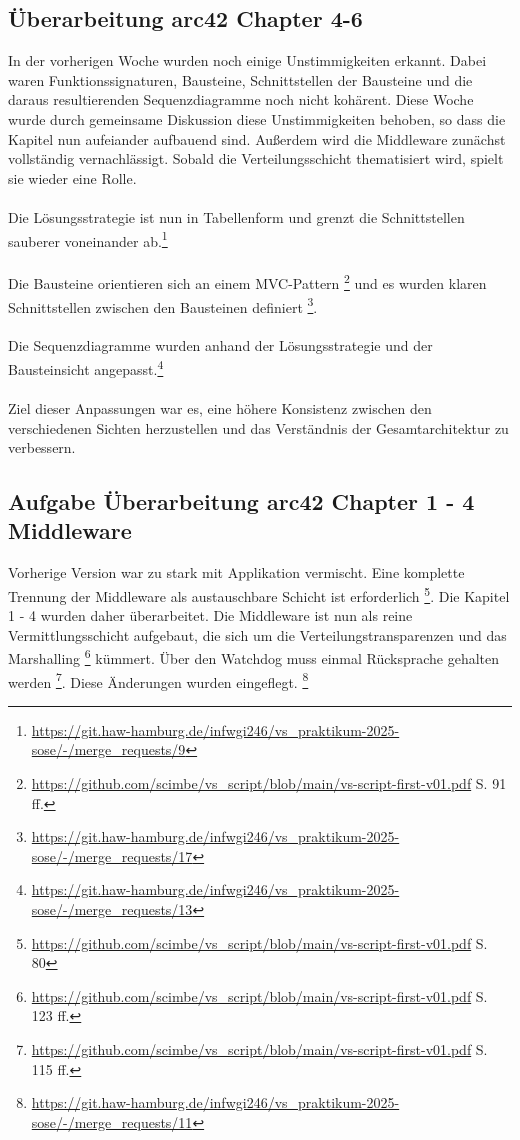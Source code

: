 \documentclass{article}
\begin{document}
\subsection{Überarbeitung arc42 Chapter 4-6}
In der vorherigen Woche wurden noch einige Unstimmigkeiten erkannt. 
Dabei waren Funktionssignaturen, Bausteine, Schnittstellen der Bausteine und die daraus resultierenden Sequenzdiagramme noch nicht kohärent.
Diese Woche wurde durch gemeinsame Diskussion diese Unstimmigkeiten behoben, so dass die Kapitel nun aufeiander aufbauend sind. 
Außerdem wird die Middleware zunächst vollständig vernachlässigt. Sobald die Verteilungsschicht thematisiert wird, spielt sie wieder eine Rolle.
\\\\
Die Lösungsstrategie ist nun in Tabellenform und grenzt die Schnittstellen sauberer voneinander ab.\footnote{\url{https://git.haw-hamburg.de/infwgi246/vs_praktikum-2025-sose/-/merge_requests/9}}
\\\\
Die Bausteine orientieren sich an einem MVC-Pattern \footnote{\url{https://github.com/scimbe/vs_script/blob/main/vs-script-first-v01.pdf} S. 91 ff. } und es wurden klaren Schnittstellen zwischen den Bausteinen definiert \footnote{\url{https://git.haw-hamburg.de/infwgi246/vs_praktikum-2025-sose/-/merge_requests/17}}.
\\\\
Die Sequenzdiagramme wurden anhand der Lösungsstrategie und der Bausteinsicht angepasst.\footnote{\url{https://git.haw-hamburg.de/infwgi246/vs_praktikum-2025-sose/-/merge_requests/13}}\\\\
Ziel dieser Anpassungen war es, eine höhere Konsistenz zwischen den verschiedenen Sichten herzustellen und das Verständnis der Gesamtarchitektur zu verbessern.




\subsection{Aufgabe Überarbeitung arc42 Chapter 1 - 4 Middleware}
Vorherige Version war zu stark mit Applikation vermischt. Eine komplette Trennung der Middleware als austauschbare Schicht ist erforderlich \footnote{\url{https://github.com/scimbe/vs_script/blob/main/vs-script-first-v01.pdf} S. 80 }. 
Die Kapitel 1 - 4 wurden daher überarbeitet. 
Die Middleware ist nun als reine Vermittlungsschicht aufgebaut, die sich um die Verteilungstransparenzen und das Marshalling \footnote{\url{https://github.com/scimbe/vs_script/blob/main/vs-script-first-v01.pdf} S. 123 ff. } kümmert. 
Über den Watchdog muss einmal Rücksprache gehalten werden \footnote{\url{https://github.com/scimbe/vs_script/blob/main/vs-script-first-v01.pdf} S. 115 ff. }. Diese Änderungen wurden eingeflegt.
\footnote{\url{https://git.haw-hamburg.de/infwgi246/vs_praktikum-2025-sose/-/merge_requests/11}}
\end{document}

